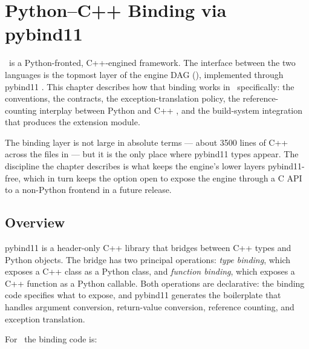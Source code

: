 \chapter{Python--C++ Binding via pybind11}
\label{ch:python_cpp_binding}

\Lucid\ is a Python-fronted, C++-engined framework. The interface
between the two languages is the topmost layer of the engine DAG
(), implemented through pybind11
\cite{pybind11}. This chapter describes how that binding works in
\Lucid\ specifically: the conventions, the contracts, the
exception-translation policy, the reference-counting interplay
between Python and C++ , and the build-system
integration that produces the  extension module.

The binding layer is not large in absolute terms --- about 3500
lines of C++ across the files in  --- but
it is the only place where pybind11 types appear. The discipline
the chapter describes is what keeps the engine's lower layers
pybind11-free, which in turn keeps the option open to expose the
engine through a C API to a non-Python frontend in a future
release.

\section{Overview}
\label{sec:python_cpp_binding:overview}

pybind11 is a header-only C++ library that bridges between C++
types and Python objects. The bridge has two principal operations:
\emph{type binding}, which exposes a C++ class as a Python class,
and \emph{function binding}, which exposes a C++ function as a
Python callable. Both operations are declarative: the binding code
specifies what to expose, and pybind11 generates the
boilerplate that handles argument conversion, return-value
conversion, reference counting, and exception translation.

For \Lucid\ the binding code is:

